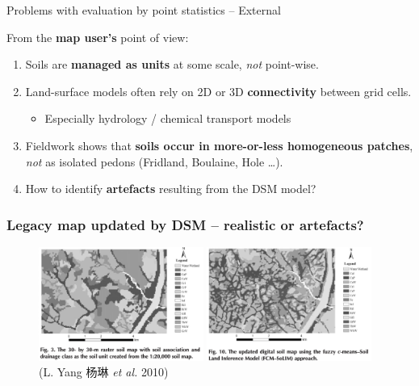 \documentclass[aspectratio=169, 10pt]{beamer}
\begin{document}
\begin{frame}{Problems with evaluation by point statistics -- External}

From the \textbf{map user's} point of view:
\begin{enumerate}
\item  Soils are \textbf{managed as units} at some scale, \emph{not} point-wise.
\item  Land-surface models often rely on 2D or 3D \textbf{connectivity} between grid cells.
  \begin{itemize}
  \item Especially hydrology / chemical transport models
  \end{itemize}
\item  Fieldwork shows that \textbf{soils  occur in more-or-less homogeneous patches}, \emph{not} as isolated
  pedons (Fridland, Boulaine, Hole \ldots).
\item How to identify \textbf{artefacts} resulting from the DSM model?
  \end{enumerate}
  
\end{frame}

\begin{frame}
  \frametitle{Legacy map updated by DSM -- realistic or artefacts?}
    \begin{figure}
        {\centering
        \includegraphics[width=0.48\textwidth]{./graphics_david/sssaj2010.0002_YL_original.png}
        \hfill
        \includegraphics[width=0.48\textwidth]{./graphics_david/sssaj2010.0002_YL_updated.png}
        }\\\flushleft(L. Yang 杨琳 \emph{et al.} 2010)  
    \end{figure}
\end{frame}
\end{document}
